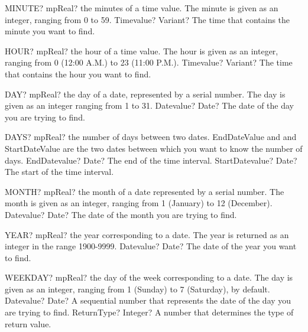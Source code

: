 \documentclass[12pt,a4paper,openany]{book}
\begin{document}
\begin{mpFunctionsExtract}
\mpWorksheetFunctionOneNotImplemented
{MINUTE? mpReal? the minutes of a time value. The minute is given as an integer, ranging from 0 to 59.}
{Timevalue? Variant? The time that contains the minute you want to find.}
\end{mpFunctionsExtract}

\begin{mpFunctionsExtract}
\mpWorksheetFunctionOneNotImplemented
{HOUR? mpReal? the hour of a time value. The hour is given as an integer, ranging from 0 (12:00 A.M.) to 23 (11:00 P.M.).}
{Timevalue? Variant? The time that contains the hour you want to find.}
\end{mpFunctionsExtract}

\begin{mpFunctionsExtract}
\mpWorksheetFunctionOneNotImplemented
{DAY? mpReal? the day of a date, represented by a serial number. The day is given as an integer ranging from 1 to 31.}
{Datevalue? Date? The date of the day you are trying to find.}
\end{mpFunctionsExtract}

\begin{mpFunctionsExtract}
\mpWorksheetFunctionTwoNotImplemented
{DAYS? mpReal? the number of days between two dates. EndDateValue and  and StartDateValue  are the two dates between which you want to know the number of days.}
{EndDatevalue? Date? The end of the time interval.}
{StartDatevalue? Date? The start of the time interval.}
\end{mpFunctionsExtract}

\begin{mpFunctionsExtract}
\mpWorksheetFunctionOneNotImplemented
{MONTH? mpReal? the month of a date represented by a serial number. The month is given as an integer, ranging from 1 (January) to 12 (December).}
{Datevalue? Date? The date of the month you are trying to find.}
\end{mpFunctionsExtract}

\begin{mpFunctionsExtract}
\mpWorksheetFunctionOneNotImplemented
{YEAR? mpReal? the year corresponding to a date. The year is returned as an integer in the range 1900-9999.}
{Datevalue? Date? The date of the year you want to find.}
\end{mpFunctionsExtract}

\begin{mpFunctionsExtract}
\mpWorksheetFunctionTwoNotImplemented
{WEEKDAY? mpReal? the day of the week corresponding to a date. The day is given as an integer, ranging from 1 (Sunday) to 7 (Saturday), by default.}
{Datevalue? Date? A sequential number that represents the date of the day you are trying to find.}
{ReturnType? Integer? A number that determines the type of return value.}
\end{mpFunctionsExtract}
\end{document}
